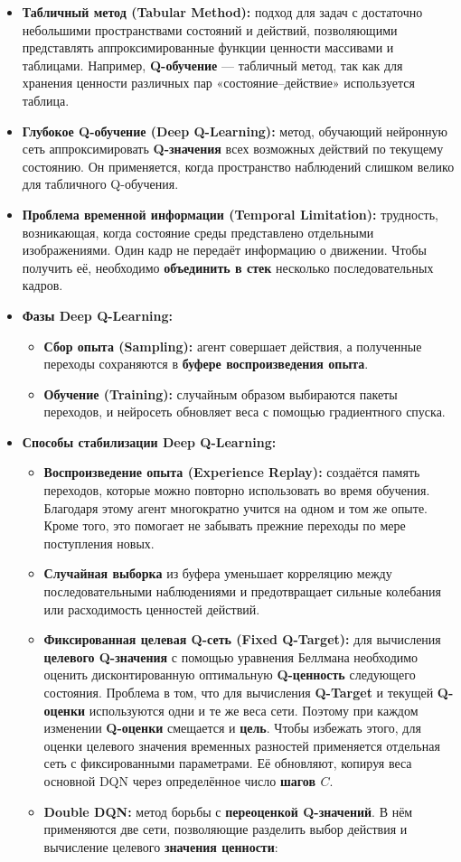 \documentclass[11pt,a4paper]{article}
\begin{document}
\begin{itemize}
\item
\textbf{Табличный метод (Tabular Method):} подход для задач с достаточно небольшими пространствами состояний и действий, позволяющими представлять аппроксимированные функции ценности массивами и таблицами. Например, \textbf{Q-обучение} --- табличный метод, так как для хранения ценности различных пар «состояние--действие» используется таблица.
\item
\textbf{Глубокое Q-обучение (Deep Q-Learning):} метод, обучающий нейронную сеть аппроксимировать \textbf{Q-значения} всех возможных действий по текущему состоянию. Он применяется, когда пространство наблюдений слишком велико для табличного Q-обучения.
\item
\textbf{Проблема временной информации (Temporal Limitation):} трудность, возникающая, когда состояние среды представлено отдельными изображениями. Один кадр не передаёт информацию о движении. Чтобы получить её, необходимо \textbf{объединить в стек} несколько последовательных кадров.
\item
\textbf{Фазы Deep Q-Learning:}

  \begin{itemize}
  \tightlist
  \item
\textbf{Сбор опыта (Sampling):} агент совершает действия, а полученные переходы сохраняются в \textbf{буфере воспроизведения опыта}.
  \item
\textbf{Обучение (Training):} случайным образом выбираются пакеты переходов, и нейросеть обновляет веса с помощью градиентного спуска.
  \end{itemize}
\item
\textbf{Способы стабилизации Deep Q-Learning:}

  \begin{itemize}
  \item
\textbf{Воспроизведение опыта (Experience Replay):} создаётся память переходов, которые можно повторно использовать во время обучения. Благодаря этому агент многократно учится на одном и том же опыте. Кроме того, это помогает не забывать прежние переходы по мере поступления новых.
  \item
\textbf{Случайная выборка} из буфера уменьшает корреляцию между последовательными наблюдениями и предотвращает сильные колебания или расходимость ценностей действий.
  \item
\textbf{Фиксированная целевая Q-сеть (Fixed Q-Target):} для вычисления \textbf{целевого Q-значения} с помощью уравнения Беллмана необходимо оценить дисконтированную оптимальную \textbf{Q-ценность} следующего состояния. Проблема в том, что для вычисления \textbf{Q-Target} и текущей \textbf{Q-оценки} используются одни и те же веса сети. Поэтому при каждом изменении \textbf{Q-оценки} смещается и \textbf{цель}. Чтобы избежать этого, для оценки целевого значения временных разностей применяется отдельная сеть с фиксированными параметрами. Её обновляют, копируя веса основной DQN через определённое число \textbf{шагов \(C\)}.
  \item
\textbf{Double DQN:} метод борьбы с \textbf{переоценкой Q-значений}. В нём применяются две сети, позволяющие разделить выбор действия и вычисление целевого \textbf{значения ценности}:


\end{itemize}
\end{itemize}
\end{document}
